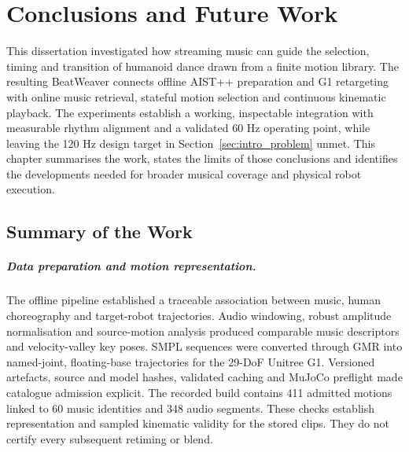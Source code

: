 
\chapter{Conclusions and Future Work}
\label{chap:conclusions_future_work}

This dissertation investigated how streaming music can guide the selection,
timing and transition of humanoid dance drawn from a finite motion library.
The resulting BeatWeaver connects offline AIST++ preparation and G1
retargeting with online music retrieval, stateful motion selection and
continuous kinematic playback. The experiments establish a working,
inspectable integration with measurable rhythm alignment and a validated 60 Hz
operating point, while leaving the 120 Hz design target in
Section~\ref{sec:intro_problem} unmet. This chapter summarises the
work, states the limits of those conclusions and identifies the developments
needed for broader musical coverage and physical robot execution.

\section{Summary of the Work}
\label{sec:ch7_summary}

\paragraph{Data preparation and motion representation.}
The offline pipeline established a traceable association between music,
human choreography and target-robot trajectories. Audio windowing, robust
amplitude normalisation and source-motion analysis produced comparable music
descriptors and velocity-valley key poses. SMPL sequences were converted through
GMR into named-joint, floating-base trajectories for the 29-DoF Unitree G1.
Versioned artefacts, source and model hashes, validated caching and MuJoCo
preflight made catalogue admission explicit. The recorded build contains
411 admitted motions linked to 60 music identities and 348 audio segments.
These checks establish representation and sampled kinematic validity for the
stored clips. They do not certify every subsequent retiming or blend.

